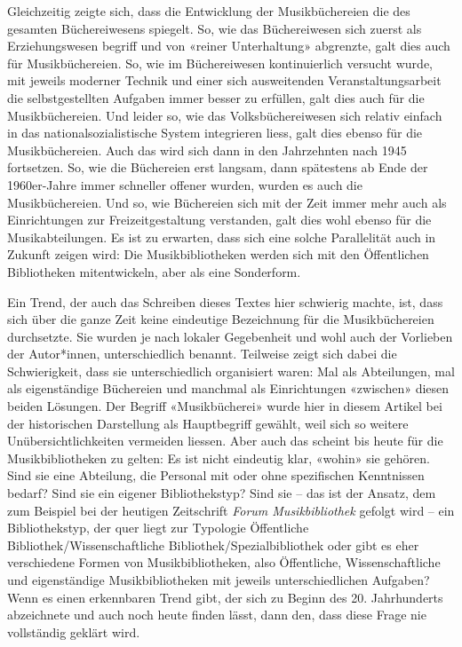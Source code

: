 \documentclass[a4paper,
fontsize=11pt,
oneside,
numbers=noperiodatend,
parskip=half-,
bibliography=totoc,
final
]{scrartcl}
\begin{document}
Gleichzeitig zeigte sich, dass die Entwicklung der Musikbüchereien die
des gesamten Büchereiwesens spiegelt. So, wie das Büchereiwesen sich
zuerst als Erziehungswesen begriff und von «reiner Unterhaltung»
abgrenzte, galt dies auch für Musikbüchereien. So, wie im Büchereiwesen
kontinuierlich versucht wurde, mit jeweils moderner Technik und einer
sich ausweitenden Veranstaltungsarbeit die selbstgestellten Aufgaben
immer besser zu erfüllen, galt dies auch für die Musikbüchereien. Und
leider so, wie das Volksbüchereiwesen sich relativ einfach in das
nationalsozialistische System integrieren liess, galt dies ebenso für
die Musikbüchereien. Auch das wird sich dann in den Jahrzehnten nach
1945 fortsetzen. So, wie die Büchereien erst langsam, dann spätestens ab
Ende der 1960er-Jahre immer schneller offener wurden, wurden es auch die
Musikbüchereien. Und so, wie Büchereien sich mit der Zeit immer mehr
auch als Einrichtungen zur Freizeitgestaltung verstanden, galt dies wohl
ebenso für die Musikabteilungen. Es ist zu erwarten, dass sich eine
solche Parallelität auch in Zukunft zeigen wird: Die Musikbibliotheken
werden sich mit den Öffentlichen Bibliotheken mitentwickeln, aber als
eine Sonderform.

Ein Trend, der auch das Schreiben dieses Textes hier schwierig machte,
ist, dass sich über die ganze Zeit keine eindeutige Bezeichnung für die
Musikbüchereien durchsetzte. Sie wurden je nach lokaler Gegebenheit und
wohl auch der Vorlieben der Autor*innen, unterschiedlich benannt.
Teilweise zeigt sich dabei die Schwierigkeit, dass sie unterschiedlich
organisiert waren: Mal als Abteilungen, mal als eigenständige Büchereien
und manchmal als Einrichtungen «zwischen» diesen beiden Lösungen. Der
Begriff «Musikbücherei» wurde hier in diesem Artikel bei der
historischen Darstellung als Hauptbegriff gewählt, weil sich so weitere
Unübersichtlichkeiten vermeiden liessen. Aber auch das scheint bis heute
für die Musikbibliotheken zu gelten: Es ist nicht eindeutig klar,
«wohin» sie gehören. Sind sie eine Abteilung, die Personal mit oder ohne
spezifischen Kenntnissen bedarf? Sind sie ein eigener Bibliothekstyp?
Sind sie -- das ist der Ansatz, dem zum Beispiel bei der heutigen
Zeitschrift \emph{Forum Musikbibliothek} gefolgt wird -- ein
Bibliothekstyp, der quer liegt zur Typologie Öffentliche
Bibliothek/Wissenschaftliche Bibliothek/Spezialbibliothek oder gibt es
eher verschiedene Formen von Musikbibliotheken, also Öffentliche,
Wissenschaftliche und eigenständige Musikbibliotheken mit jeweils
unterschiedlichen Aufgaben? Wenn es einen erkennbaren Trend gibt, der
sich zu Beginn des 20. Jahrhunderts abzeichnete und auch noch heute
finden lässt, dann den, dass diese Frage nie vollständig geklärt wird.
\end{document}
